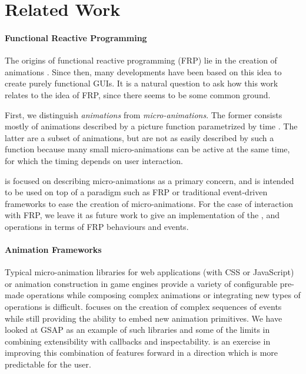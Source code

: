 \section{Related Work}
\label{sec:related}

\paragraph{Functional Reactive Programming}
The origins of functional reactive programming (FRP) lie in the creation of animations \cite{DBLP:conf/icfp/ElliottH97}. Since then, many developments have been based on this idea to create purely functional GUIs. It is a natural question to ask how this work relates to the idea of FRP, since there seems to be some common ground.

First, we distinguish \emph{animations} from \emph{micro-animations}. The former consists mostly of animations described by a picture function parametrized by time . The latter are a subset of animations, but are not as easily described by such a function because many small micro-animations can be active at the same time, for which the timing depends on user interaction.

\dsl{} is focused on describing micro-animations as a primary concern, and is intended to be used on top of a paradigm such as FRP or traditional event-driven frameworks to ease the creation of micro-animations. For the case of interaction with FRP, we leave it as future work to give an implementation of the ,  and  operations in terms of FRP behaviours and events.

\paragraph{Animation Frameworks}

Typical micro-animation libraries for web applications (with CSS or JavaScript) or animation construction in game engines provide a variety of configurable pre-made operations while composing complex animations or integrating new types of operations is difficult. \dsl{} focuses on the creation of complex sequences of events while still providing the ability to embed new animation primitives. We have looked at GSAP as an example of such libraries and some of the limits in combining extensibility with callbacks and inspectability. \dsl{} is an exercise in improving this combination of features forward in a direction which is more predictable for the user.

